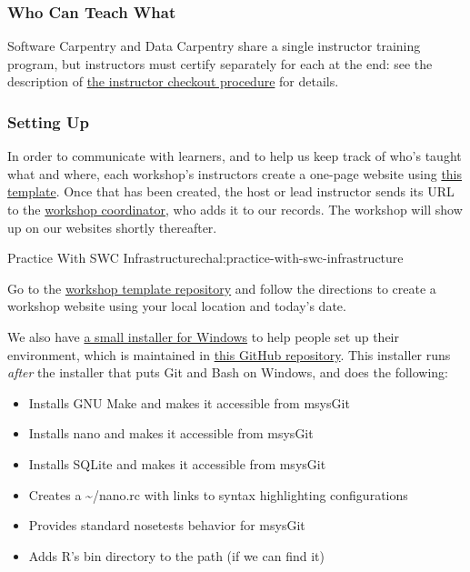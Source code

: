 \subsubsection{Who Can Teach What}\label{who-can-teach-what}

Software Carpentry and Data Carpentry share a single instructor training
program, but instructors must certify separately for each at the end:
see the description of \href{\{\{\%20page.root\%20\}\}/checkout/}{the
instructor checkout procedure} for details.

\subsubsection{Setting Up}\label{setting-up}

In order to communicate with learners, and to help us keep track of
who's taught what and where, each workshop's instructors create a
one-page website using \href{\{\{\%20site.workshop\_repo\%20\}\}}{this
template}. Once that has been created, the host or lead instructor sends
its URL to the \href{\{\{\%20site.contact\%20\}\}}{workshop
coordinator}, who adds it to our records. The workshop will show up on
our websites shortly thereafter.

\begin{challenge}{Practice With SWC Infrastructure}{chal:practice-with-swc-infrastructure}

Go to the \href{\{\{\%20site.workshop\_repo\%20\}\}}{workshop template
repository} and follow the directions to create a workshop website using
your local location and today's date.
\end{challenge}

We also have
\href{https://github.com/swcarpentry/windows-installer/releases/download/v0.3/SWCarpentryInstaller.exe}{a
small installer for Windows} to help people set up their environment,
which is maintained in
\href{https://github.com/swcarpentry/windows-installer}{this GitHub
repository}. This installer runs \emph{after} the installer that puts
Git and Bash on Windows, and does the following:

\begin{itemize}
\itemsep1pt\parskip0pt
\item
  Installs GNU Make and makes it accessible from msysGit
\item
  Installs nano and makes it accessible from msysGit
\item
  Installs SQLite and makes it accessible from msysGit
\item
  Creates a \textasciitilde{}/nano.rc with links to syntax highlighting
  configurations
\item
  Provides standard nosetests behavior for msysGit
\item
  Adds R's bin directory to the path (if we can find it)
\end{itemize}

